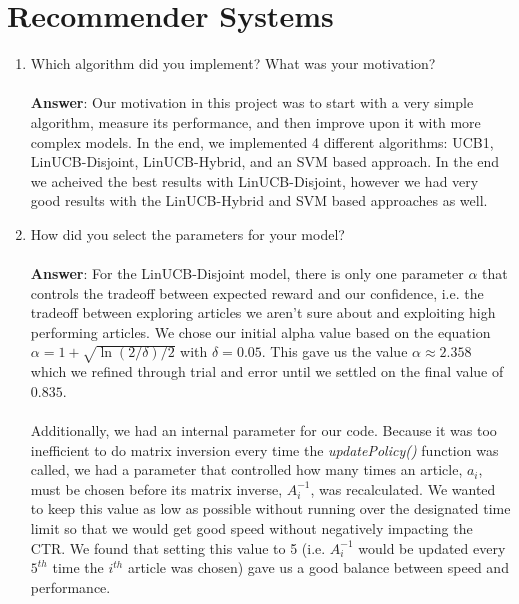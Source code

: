\documentclass[11pt]{article}
\begin{document}
\section{Recommender Systems}

\begin{enumerate}
\item Which algorithm did you implement? What was your motivation? \\ \\
\textbf{Answer}: Our motivation in this project was to start with a very simple algorithm,
measure its performance, and then improve upon it with more complex models.  In
the end, we implemented 4 different algorithms: UCB1, LinUCB-Disjoint, LinUCB-Hybrid, and an SVM
based approach.  In the end we acheived the best results with LinUCB-Disjoint,
however we had very good results with the LinUCB-Hybrid and SVM based approaches
as well.

\item How did you select the parameters for your model? \\ \\
\textbf{Answer}: For the LinUCB-Disjoint model, there is only one parameter
$\alpha$ that controls the tradeoff between expected reward and our confidence,
i.e. the tradeoff between exploring articles we aren't sure about and exploiting
high performing articles. We chose our initial alpha value based on the equation
$\alpha=1+\sqrt{\ln(2/\delta)/2}$ with $\delta=0.05$.  This gave us the value
$\alpha\approx2.358$ which we refined through trial and error until we settled
on the final value of $0.835$. \\ \\
Additionally, we had an internal parameter for our code.  Because it was too
inefficient to do matrix inversion every time the \textit{updatePolicy()}
function was called, we had a parameter that controlled how many times an
article, $a_i$, must be chosen before its matrix inverse, $A_{i}^{-1}$, was
recalculated. We wanted to keep this value as low as possible without running
over the designated time limit so that we would get good speed without
negatively impacting the CTR. We found that setting this value to 5 (i.e.
$A_{i}^{-1}$ would be updated every $5^{th}$ time the $i^{th}$ article was
chosen) gave us a good balance between speed and performance.


\end{enumerate}
\end{document}
